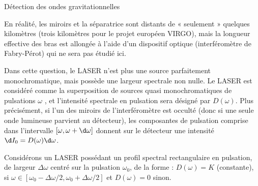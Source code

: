\begin{exo}[PC][1][devoir]{Détection des ondes gravitationnelles}
\begin{quest}
\end{quest}

En réalité, les miroirs et la séparatrice sont distants de « seulement » quelques kilomètres (trois kilomètres pour le projet européen VIRGO), mais la longueur effective des bras est allongée à l'aide d'un dispositif optique (interféromètre de Fabry-Pérot) qui ne sera pas étudié ici.


Dans cette question, le LASER n'est plus une source parfaitement monochromatique, mais possède une largeur spectrale non nulle. Le LASER est considéré comme la superposition de sources quasi monochromatiques de pulsations $\omega$ , et l'intensité spectrale en pulsation sera désigné par $D(\omega)$.
Plus précisément, si l'un des miroirs de l'interféromètre est occulté (donc si une seule onde lumineuse
parvient au détecteur), les composantes de pulsation comprise dans l'intervalle $[\omega,  \omega + \d \omega  ]$ donnent sur le détecteur une intensité $\d I_0 = D(\omega) \d \omega$.

Considérons un LASER possédant un profil spectral rectangulaire en pulsation, de largeur $\Delta \omega$  centré sur la pulsation $\omega_0$, de la forme :
$D(\omega)  = K$ (constante), si  $\omega \in [ \omega_0- \Delta \omega/2, \omega_0+ \Delta \omega /2  ]$ et
$D(\omega)  = 0$  sinon.


\end{exo}
